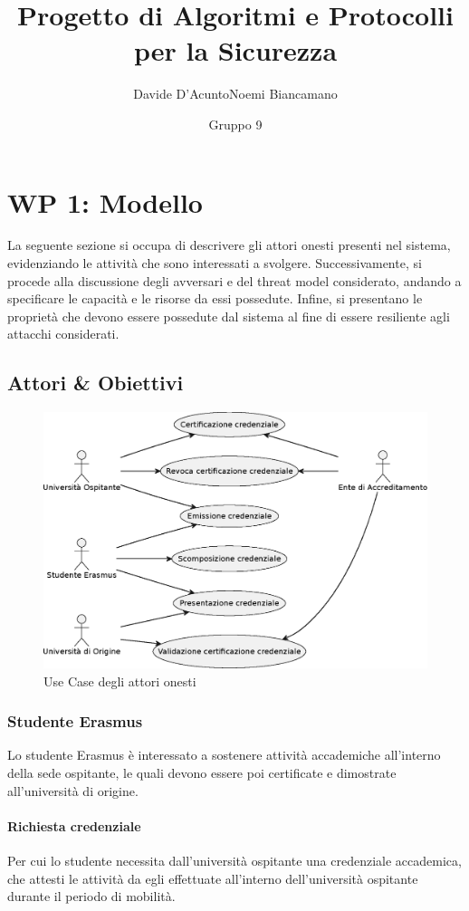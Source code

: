 \documentclass[a4paper,12pt]{article}
\title{Progetto di Algoritmi e Protocolli per la Sicurezza}
\author{Davide D'Acunto\quad Noemi Biancamano}
\date{Gruppo 9}
\begin{document}
\maketitle

\tableofcontents
\newpage
\section{WP 1: Modello}
La seguente sezione si occupa di descrivere gli attori onesti presenti nel sistema, evidenziando le attività che sono interessati a svolgere.
\newline Successivamente, si procede alla discussione degli avversari e del threat model considerato, andando a specificare le capacità e le risorse da essi possedute. Infine, si presentano le proprietà che devono essere possedute dal sistema al fine di essere resiliente agli attacchi considerati.
\subsection{Attori \& Obiettivi}
\begin{figure}[H]
    \centering
    \includegraphics[width=\textwidth]{usecase_1.eps}
    \caption{Use Case degli attori onesti}
    \label{fig:usecase1}
\end{figure}
\subsubsection{Studente Erasmus}
Lo studente Erasmus è interessato a sostenere attività accademiche all'interno della sede ospitante, le quali devono essere poi certificate e dimostrate all'università di origine.
\paragraph{Richiesta credenziale} Per cui lo studente necessita dall'università ospitante una credenziale accademica, che attesti le attività da egli effettuate all'interno dell'università ospitante durante il periodo di mobilità.
\end{document}
